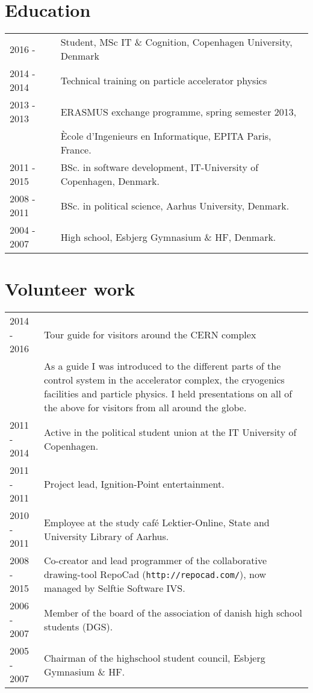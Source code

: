 \documentclass[12pt,a4paper,notitlepage]{article}
\begin{document}
\section*{Education}
\begin{tabularx}{\textwidth}{l X}
2016 - & Student, MSc IT \& Cognition, Copenhagen University, Denmark \\
2014 - 2014 & Technical training on particle accelerator physics \\
2013 - 2013 & ERASMUS exchange programme, spring semester 2013, \\
            & Ècole d'Ingenieurs en Informatique, EPITA Paris, France. \\
2011 - 2015 & BSc. in software development, IT-University of Copenhagen, Denmark. \\
2008 - 2011 & BSc. in political science, Aarhus University, Denmark. \\
2004 - 2007 & High school, Esbjerg Gymnasium \& HF, Denmark.
\end{tabularx}

\section*{Volunteer work}
\begin{tabularx}{\textwidth}{l X}
2014 - 2016 & Tour guide for visitors around the CERN complex \\
            & As a guide I was introduced to the different parts of the
              control system in the accelerator complex, the cryogenics
              facilities and particle physics. I held presentations
              on all of the above for visitors from all around the globe. \\
2011 - 2014 & Active in the political student union at the IT University of Copenhagen. \\
2011 - 2011 & Project lead, Ignition-Point entertainment. \\
2010 - 2011 & Employee at the study café Lektier-Online, State and University Library of Aarhus.  \\
2008 - 2015 & Co-creator and lead programmer of the collaborative drawing-tool
              RepoCad (\texttt{http://repocad.com/}), now managed by Selftie Software IVS. \\
2006 - 2007 & Member of the board of the association of danish high school students (DGS). \\
2005 - 2007 & Chairman of the highschool student council, Esbjerg Gymnasium \& HF.
\end{tabularx}
\end{document}
